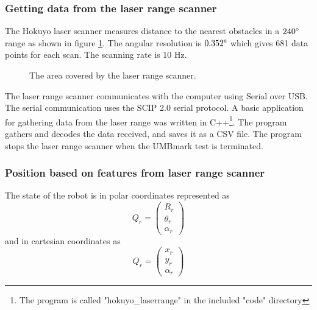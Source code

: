 \subsubsection{Getting data from the laser range scanner}
The Hokuyo laser scanner measures distance to the nearest obstacles in a $240 \degree$ range as shown in figure \ref{fig:laserrange_angle}. The angular resolution is $0.352 \degree$ which gives 681 data points for each scan. The scanning rate is 10 Hz.

\begin{figure}
 \centering
 \label{fig:laserrange_angle}
 \caption{The area covered by the laser range scanner.}
 \end{figure}

The laser range scanner communicates with the computer using Serial over USB. The serial communication uses the SCIP 2.0 serial protocol. 
A basic application for gathering data from the laser range was written
in C++\footnote{The program is called "hokuyo\_laserrange" in the included "code" directory}.
The program gathers and decodes the data received, and saves it as a CSV file.
The program stops the laser range scanner when the UMBmark test is terminated.

% 

\subsubsection{Position based on features from laser range scanner}
The state of the robot is in polar coordinates represented  as 
$$Q_r = \begin{pmatrix}
R_r\\
\theta_r\\
\alpha_r
\end{pmatrix}$$ 
and in cartesian coordinates as 
$$Q_r = \begin{pmatrix}
x_r\\
y_r\\
\alpha_r
\end{pmatrix}$$

